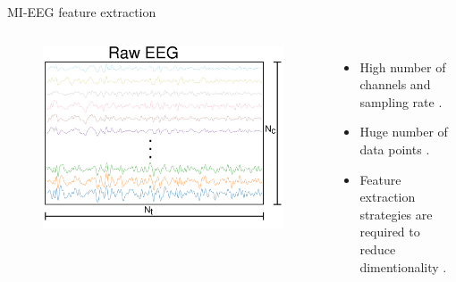 \documentclass[aspectratio=169]{beamer}
\let\oldcite\cite %
\renewcommand{\cite}[1]{{\tiny\oldcite{#1}}}
\begin{document}
\begin{frame}{MI-EEG feature extraction}
    \begin{columns}
            \begin{figure}[!ht]
                \centering
                \includegraphics[width=0.7\linewidth,trim={0 0 0 10},clip]{figures/RAW_EEG.png}
            \end{figure}
            \begin{itemize}
                \item High number of channels and sampling rate \cite{chevallier2024largest}.
                \item Huge number of data points \cite{singh2021comprehensive}.
                \item Feature extraction strategies are required to reduce dimentionality \cite{ai2019feature}.
            \end{itemize}
    \end{columns}
    \centering
    
\end{frame}
\end{document}
